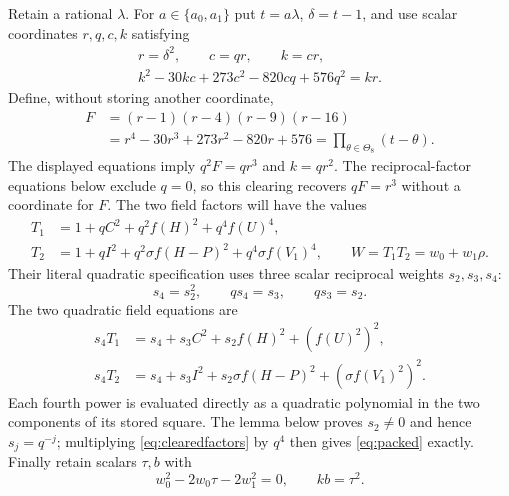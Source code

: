 \documentclass[11pt,a4paper]{article}
\begin{document}
Retain a rational $\lambda$. For $a\in\{a_0,a_1\}$ put $t=a\lambda$,
$\delta=t-1$, and use scalar coordinates $r,q,c,k$ satisfying
\begin{equation}\label{eq:contactcircuit}
 \begin{gathered}
 r=\delta^2,\qquad c=qr,\qquad k=cr,\\
 k^2-30kc+273c^2-820cq+576q^2=kr.
 \end{gathered}
\end{equation}
Define, without storing another coordinate,
\[
 \begin{split}
 F&=(r-1)(r-4)(r-9)(r-16)\\
  &=r^4-30r^3+273r^2-820r+576
    =\prod_{\theta\in\Theta_8}(t-\theta).
 \end{split}
\]
The displayed equations imply $q^2F=qr^3$ and $k=qr^2$.
The reciprocal-factor equations below exclude $q=0$, so this clearing
recovers $qF=r^3$ without a coordinate for $F$.
The two field factors will have the values
\begin{equation}\label{eq:packed}
 \begin{split}
 T_1&=1+qC^2+q^2f(H)^2+q^4f(U)^4,\\
 T_2&=1+qI^2+q^2\sigma f(H-P)^2+q^4\sigma f(V_1)^4,
 \qquad W=T_1T_2=w_0+w_1\rho.
 \end{split}
\end{equation}
Their literal quadratic specification uses three scalar reciprocal
weights $s_2,s_3,s_4$:
\begin{equation}\label{eq:reciprocalweights}
                 s_4=s_2^2,\qquad qs_4=s_3,\qquad qs_3=s_2.
\end{equation}
The two quadratic field equations are
\begin{equation}\label{eq:clearedfactors}
 \begin{split}
 s_4T_1&=s_4+s_3C^2+s_2f(H)^2+(f(U)^2)^2,\\
 s_4T_2&=s_4+s_3I^2+s_2\sigma f(H-P)^2+(\sigma f(V_1)^2)^2.
 \end{split}
\end{equation}
Each fourth power is evaluated directly as a quadratic polynomial in
the two components of its stored square. The lemma below proves
$s_2\ne0$ and hence $s_j=q^{-j}$; multiplying
\eqref{eq:clearedfactors} by $q^4$ then gives \eqref{eq:packed} exactly.
Finally retain scalars $\tau,b$ with
\begin{equation}\label{eq:trace}
             w_0^2-2w_0\tau-2w_1^2=0,\qquad
             kb=\tau^2.
\end{equation}
\end{document}
